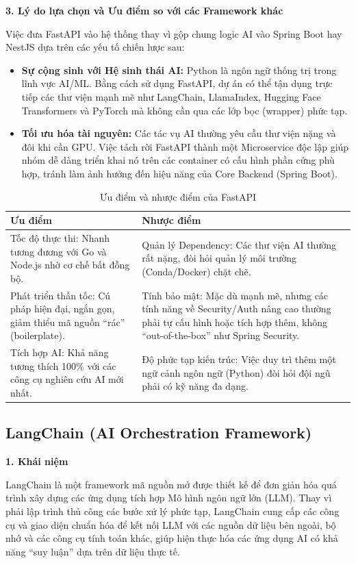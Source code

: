 \documentclass[12pt,a4paper]{report}
\begin{document}
\textbf{3. Lý do lựa chọn và Ưu điểm so với các Framework khác}

Việc đưa FastAPI vào hệ thống thay vì gộp chung logic AI vào Spring Boot hay NestJS dựa trên các yếu tố chiến lược sau:
\begin{itemize}
    \item \textbf{Sự cộng sinh với Hệ sinh thái AI:} Python là ngôn ngữ thống trị trong lĩnh vực AI/ML. Bằng cách sử dụng FastAPI, dự án có thể tận dụng trực tiếp các thư viện mạnh mẽ như LangChain, LlamaIndex, Hugging Face Transformers và PyTorch mà không cần qua các lớp bọc (wrapper) phức tạp.
    \item \textbf{Tối ưu hóa tài nguyên:} Các tác vụ AI thường yêu cầu thư viện nặng và đôi khi cần GPU. Việc tách rời FastAPI thành một Microservice độc lập giúp nhóm dễ dàng triển khai nó trên các container có cấu hình phần cứng phù hợp, tránh làm ảnh hưởng đến hiệu năng của Core Backend (Spring Boot).
\end{itemize}

\begin{table}[H]
\centering
\caption{Ưu điểm và nhược điểm của FastAPI}
\label{tab:fastapi_pros_cons}
\begin{tabularx}{\textwidth}{|X|X|}
\hline
\textbf{Ưu điểm} & \textbf{Nhược điểm} \\ \hline
Tốc độ thực thi: Nhanh tương đương với Go và Node.js nhờ cơ chế bất đồng bộ. & Quản lý Dependency: Các thư viện AI thường rất nặng, đòi hỏi quản lý môi trường (Conda/Docker) chặt chẽ. \\ \hline
Phát triển thần tốc: Cú pháp hiện đại, ngắn gọn, giảm thiểu mã nguồn ``rác'' (boilerplate). & Tính bảo mật: Mặc dù mạnh mẽ, nhưng các tính năng về Security/Auth nâng cao thường phải tự cấu hình hoặc tích hợp thêm, không ``out-of-the-box'' như Spring Security. \\ \hline
Tích hợp AI: Khả năng tương thích 100\% với các công cụ nghiên cứu AI mới nhất. & Độ phức tạp kiến trúc: Việc duy trì thêm một ngữ cảnh ngôn ngữ (Python) đòi hỏi đội ngũ phải có kỹ năng đa dạng. \\ \hline
\end{tabularx}
\end{table}

\subsection{LangChain (AI Orchestration Framework)}
\textbf{1. Khái niệm}

LangChain là một framework mã nguồn mở được thiết kế để đơn giản hóa quá trình xây dựng các ứng dụng tích hợp Mô hình ngôn ngữ lớn (LLM). Thay vì phải lập trình thủ công các bước xử lý phức tạp, LangChain cung cấp các công cụ và giao diện chuẩn hóa để kết nối LLM với các nguồn dữ liệu bên ngoài, bộ nhớ và các công cụ tính toán khác, giúp hiện thực hóa các ứng dụng AI có khả năng ``suy luận'' dựa trên dữ liệu thực tế.
\end{document}
